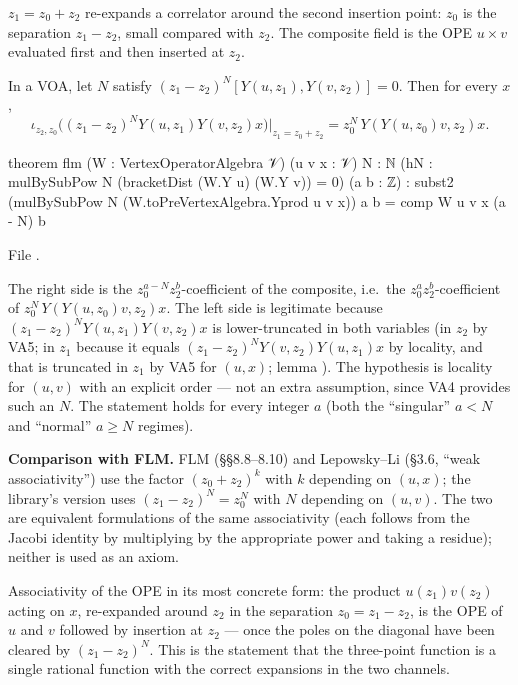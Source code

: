 \begin{physics}
$z_1 = z_0+z_2$ re-expands a correlator around the second insertion point: $z_0$ is the separation
$z_1-z_2$, small compared with $z_2$. The composite field is the OPE $u\times v$ evaluated first and
then inserted at $z_2$.
\end{physics}

\begin{theorem}\label{l03:thm:flm}
In a VOA, let $N$ satisfy $(z_1-z_2)^N[Y(u,z_1),Y(v,z_2)] = 0$. Then for every $x$,
\begin{equation*}
\iota_{z_2,z_0}\Big((z_1-z_2)^NY(u,z_1)Y(v,z_2)x\Big)\Big|_{z_1 = z_0+z_2} = z_0^N\,Y(Y(u,z_0)v,z_2)x .
\end{equation*}
\end{theorem}
\begin{leancode}
theorem flm (W : VertexOperatorAlgebra 𝒱) (u v x : 𝒱) {N : ℕ}
    (hN : mulBySubPow N (bracketDist (W.Y u) (W.Y v)) = 0) (a b : ℤ) :
    subst2 (mulBySubPow N (W.toPreVertexAlgebra.Yprod u v x)) a b = comp W u v x (a - N) b
\end{leancode}
File .

\begin{dictionary}
The right side  is the $z_0^{a-N}z_2^b$-coefficient of the composite,
i.e.\ the $z_0^az_2^b$-coefficient of $z_0^N\,Y(Y(u,z_0)v,z_2)x$. The left side is legitimate because
$(z_1-z_2)^NY(u,z_1)Y(v,z_2)x$ is lower-truncated in both variables (in $z_2$ by VA5; in $z_1$ because
it equals $(z_1-z_2)^NY(v,z_2)Y(u,z_1)x$ by locality, and that is truncated in $z_1$ by VA5 for
$(u,x)$; lemma ). The hypothesis  is locality for
$(u,v)$ with an explicit order --- not an extra assumption, since VA4 provides such an $N$. The statement
holds for every integer $a$ (both the ``singular'' $a<N$ and ``normal'' $a\ge N$ regimes).

\textbf{Comparison with FLM.} FLM (§§8.8--8.10) and Lepowsky--Li (§3.6, ``weak associativity'') use the
factor $(z_0+z_2)^{k}$ with $k$ depending on $(u,x)$; the library's version uses $(z_1-z_2)^N =
z_0^N$ with $N$ depending on $(u,v)$. The two are equivalent formulations of the same associativity
(each follows from the Jacobi identity by multiplying by the appropriate power and taking a residue);
neither is used as an axiom.
\end{dictionary}

\begin{physics}
Associativity of the OPE in its most concrete form: the product $u(z_1)v(z_2)$ acting on $x$,
re-expanded around $z_2$ in the separation $z_0 = z_1-z_2$, is the OPE of $u$ and $v$ followed by
insertion at $z_2$ --- once the poles on the diagonal have been cleared by $(z_1-z_2)^N$. This is the
statement that the three-point function is a single rational function with the correct expansions in
the two channels.
\end{physics}

